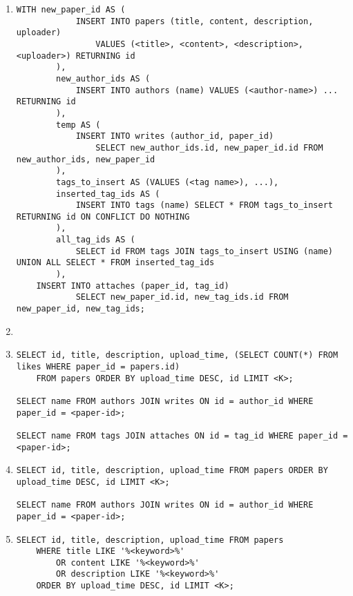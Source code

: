 \documentclass{article}
\begin{document}
\begin{enumerate}
\begin{enumerate}
        \item \begin{verbatim}
WITH new_paper_id AS (
            INSERT INTO papers (title, content, description, uploader)
                VALUES (<title>, <content>, <description>, <uploader>) RETURNING id
        ),
        new_author_ids AS (
            INSERT INTO authors (name) VALUES (<author-name>) ... RETURNING id
        ),
        temp AS (
            INSERT INTO writes (author_id, paper_id)
                SELECT new_author_ids.id, new_paper_id.id FROM new_author_ids, new_paper_id
        ),
        tags_to_insert AS (VALUES (<tag name>), ...),
        inserted_tag_ids AS (
            INSERT INTO tags (name) SELECT * FROM tags_to_insert RETURNING id ON CONFLICT DO NOTHING
        ),
        all_tag_ids AS (
            SELECT id FROM tags JOIN tags_to_insert USING (name) UNION ALL SELECT * FROM inserted_tag_ids
        ),
    INSERT INTO attaches (paper_id, tag_id)
            SELECT new_paper_id.id, new_tag_ids.id FROM new_paper_id, new_tag_ids;
\end{verbatim}
        \item {}

        \item \begin{verbatim}
SELECT id, title, description, upload_time, (SELECT COUNT(*) FROM likes WHERE paper_id = papers.id)
    FROM papers ORDER BY upload_time DESC, id LIMIT <K>;

SELECT name FROM authors JOIN writes ON id = author_id WHERE paper_id = <paper-id>;

SELECT name FROM tags JOIN attaches ON id = tag_id WHERE paper_id = <paper-id>;
\end{verbatim}

        \item \begin{verbatim}
SELECT id, title, description, upload_time FROM papers ORDER BY upload_time DESC, id LIMIT <K>;

SELECT name FROM authors JOIN writes ON id = author_id WHERE paper_id = <paper-id>;
\end{verbatim}

        \item \begin{verbatim}
SELECT id, title, description, upload_time FROM papers
    WHERE title LIKE '%<keyword>%'
        OR content LIKE '%<keyword>%'
        OR description LIKE '%<keyword>%'
    ORDER BY upload_time DESC, id LIMIT <K>;


\end{verbatim}
\end{enumerate}
\end{enumerate}
\end{document}
